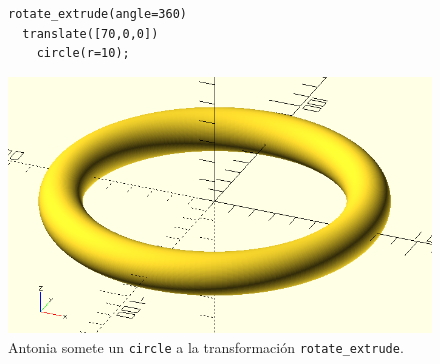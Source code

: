   
  \begin{figure}[ht]
  \begin{minipage}[]{.5\textwidth}%
    \begin{lstlisting}
rotate_extrude(angle=360)
  translate([70,0,0])
    circle(r=10);
  \end{lstlisting}
\end{minipage}\hfill
\begin{minipage}[]{.5\textwidth}%
  \flushright
  \includegraphics[width=.9\textwidth]{imagenes/rotate-circle}
\end{minipage}
\caption{Antonia somete un \lstinline!circle! a la transformación
  \lstinline!rotate_extrude!.}
    \label{fig:rotate-circle}
  \end{figure}%
